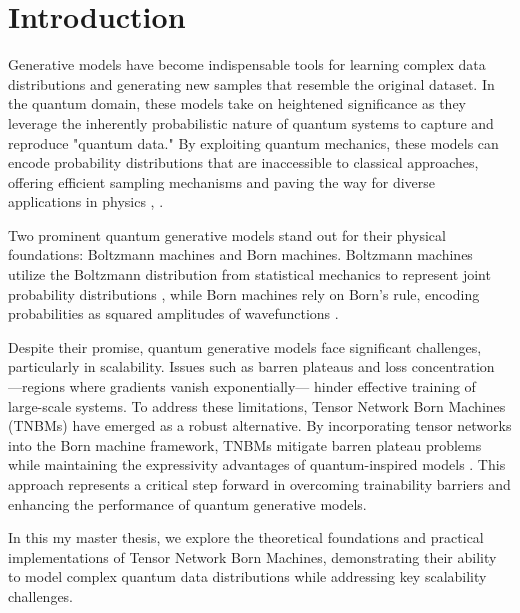 \chapter{Introduction}
Generative models have become indispensable tools for learning complex data distributions and generating new samples that resemble the original dataset. In the quantum domain, these models take on heightened significance as they leverage the inherently probabilistic nature of quantum systems to capture and reproduce "quantum data." By exploiting quantum mechanics, these models can encode probability distributions that are inaccessible to classical approaches, offering efficient sampling mechanisms and paving the way for diverse applications in physics \cite{perdomo-ortiz_opportunities_2018, noauthor_born_nodate, sweke_quantum_2021, gao_enhancing_2022}, .

Two prominent quantum generative models stand out for their physical foundations: Boltzmann machines and Born machines. Boltzmann machines utilize the Boltzmann distribution from statistical mechanics to represent joint probability distributions \cite{hinton_learning_1986}, while Born machines rely on Born's rule, encoding probabilities as squared amplitudes of wavefunctions \cite{liu_differentiable_2018, han_unsupervised_2018, perdomo-ortiz_opportunities_2018, noauthor_born_nodate}.

Despite their promise, quantum generative models face significant challenges, particularly in scalability. Issues such as barren plateaus and loss concentration —regions where gradients vanish exponentially— hinder effective training of large-scale systems\cite{rudolph_trainability_2024}. To address these limitations, Tensor Network Born Machines\cite{han_unsupervised_2018,cheng_tree_2019,meiburg_generative_2024,ben-dov_regularized_2025} (TNBMs) have emerged as a robust alternative. By incorporating tensor networks into the Born machine framework, TNBMs mitigate barren plateau problems while maintaining the expressivity advantages of quantum-inspired models \cite{martin_barren_2023}. This approach represents a critical step forward in overcoming trainability barriers and enhancing the performance of quantum generative models.

In this my master thesis, we explore the theoretical foundations and practical implementations of Tensor Network Born Machines, demonstrating their ability to model complex quantum data distributions while addressing key scalability challenges.


